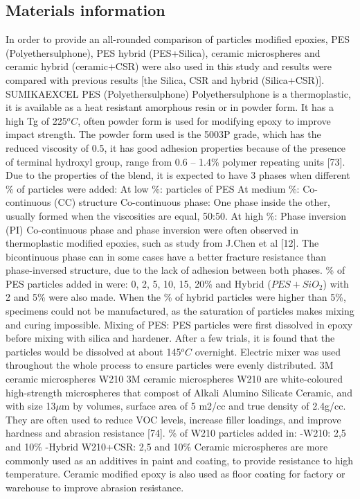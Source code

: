 \documentclass[numbers=noendperiod,chapterprefix=on]{icldt} %
\begin{document}
\subsection{Materials information}
In order to provide an all-rounded comparison of particles modified epoxies, PES (Polyethersulphone), PES hybrid (PES+Silica), ceramic microspheres and ceramic hybrid (ceramic+CSR) were also used in this study and results were compared with previous results [the Silica, CSR and hybrid (Silica+CSR)].
SUMIKAEXCEL PES (Polyethersulphone)
Polyethersulphone is a thermoplastic, it is available as a heat resistant amorphous resin or in powder form. It has a high Tg of 225$^oC$, often powder form is used for modifying epoxy to improve impact strength.  
The powder form used is the 5003P grade, which has the reduced viscosity of 0.5, it has good adhesion properties because of the presence of terminal hydroxyl group, range from 0.6 – 1.4\% polymer repeating units [73]. 
Due to the properties of the blend, it is expected to have 3 phases when different \% of particles were added:\newline
At low \%: particles of PES	\newline
At medium \%: Co-continuous (CC) structure  \newline
Co-continuous phase: One phase inside the other, usually formed when the viscosities are equal, 50:50. \newline
At high \%: Phase inversion (PI)\newline
Co-continuous phase and phase inversion were often observed in thermoplastic modified epoxies, such as study from J.Chen et al [12]. The bicontinuous phase can in some cases have a better fracture resistance than phase-inversed structure, due to the lack of adhesion between both phases.\newline
\% of PES particles added in were:
 0, 2, 5, 10, 15, 20\% and Hybrid ($PES+SiO_2$) with 2 and 5\% were also made. When the \% of hybrid particles were higher than 5\%, specimens could not be manufactured, as the saturation of particles makes mixing and curing impossible.
Mixing of PES: 
PES particles were first dissolved in epoxy before mixing with silica and hardener. After a few trials, it is found that the particles would be dissolved at about 145$^oC$ overnight. Electric mixer was used throughout the whole process to ensure particles were evenly distributed.  
3M ceramic microspheres W210
3M ceramic microspheres W210 are white-coloured high-strength microspheres that compost of Alkali Alumino Silicate Ceramic, and with size 13$\mu$m by volumes, surface area of 5 m2/cc and true density of 2.4g/cc. They are often used to reduce VOC levels, increase filler loadings, and improve hardness and abrasion resistance [74].
\% of W210 particles added in: \newline
-W210: 2,5 and 10\%\newline
-Hybrid W210+CSR: 2,5 and 10\%\newline
Ceramic microspheres are more commonly used as an additives in paint and coating, to provide resistance to high temperature. Ceramic modified epoxy is also used as floor coating for factory or warehouse to improve abrasion resistance.
\end{document}
